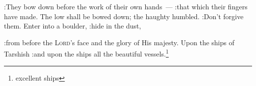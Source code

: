 \begin{inparaenum}
  :They bow down before the work of their own hands~--- :that which their fingers have made.%
   The low shall be bowed down; the haughty humbled. :Don't forgive them.%
   Enter into a boulder, :hide in the dust,%
  
  :from before the \textsc{Lord}'s face and the glory of His majesty.
   Upon the ships of Tarshish :and upon the ships all the beautiful vessels.\footnote{excellent ships}%
\end{inparaenum}
